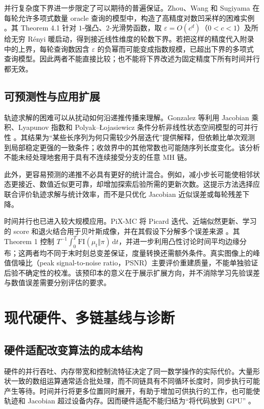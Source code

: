 \documentclass[UTF8,a4paper,zihao=-4,fontset=fandol]{ctexart}
\begin{document}
并行复杂度下界进一步限定了可以期待的普遍保证。Zhou、Wang 和 Sugiyama 在每轮允许多项式数量 oracle 查询的模型中，构造了高精度对数凹采样的困难实例 \cite{zhou2025lower}。其 Theorem 4.1 针对 $1$-强凸、$2$-光滑势函数，取 $\varepsilon=O(c^d)$（$0<c<1$）及所给无穷 Rényi 暖启动，得到接近线性维度的轮数下界。若把这样的精度代入附录中的上界，每轮查询数因含 $\varepsilon$ 的负幂而可能变成指数规模，已超出下界的多项式查询模型。因此两者不能直接比较；也不能将下界改述为固定精度下所有时间并行都无效。

\subsection{可预测性与应用扩展}

轨迹求解的困难可以从扰动如何沿递推传播来理解。Gonzalez 等利用 Jacobian 乘积、Lyapunov 指数和 Polyak–Łojasiewicz 条件分析非线性状态空间模型的可并行性 \cite{gonzalez2025predict}。其结果为“某些长序列为何只需较少外层迭代”提供解释，但依赖比单次观测到局部稳定更强的一致条件；收敛界中的其他常数也可能随序列长度变化。该分析不能未经处理地套用于具有不连续接受分支的任意 MH 链。

此外，更容易预测的递推不必具有更好的统计混合。例如，减小步长可能使相邻状态更接近、数值近似更可靠，却增加探索后验所需的更新次数。这提示方法选择应联合评价轨迹求解与统计效率，而不是只优化 Jacobian 近似误差或每轮残差下降。

时间并行也已进入较大规模应用。PiX-MC 将 Picard 迭代、近端似然更新、学习的 score 和退火结合用于贝叶斯成像，并在其假设下分解多个误差来源 \cite{wei2026}。其 Theorem 1 控制 $T^{-1}\int_0^T\mathrm{FI}(\mu_t\Vert\pi)\,\mathrm dt$，并进一步利用凸性讨论时间平均边缘分布；这两者均不同于末时刻总变差保证，度量转换还需额外条件。真实图像上的峰值信噪比（peak signal-to-noise ratio，PSNR）主要评价重建质量，不能单独验证后验不确定性的校准。该预印本的意义在于展示扩展方向，并不消除学习先验误差与数值误差需要分别评估的要求。

\section{现代硬件、多链基线与诊断}

\subsection{硬件适配改变算法的成本结构}

硬件的并行吞吐、内存带宽和控制流特征决定了同一数学操作的实际代价。大量形状一致的数组运算通常适合批处理，而不同链具有不同循环长度时，同步执行可能产生等待。时间并行将更多位置同时展开，有助于增加可供执行的工作，也可能使轨迹和 Jacobian 超过设备内存。因而硬件适配不能归结为“将代码放到 GPU” \cite{sountsov2026}。
\end{document}

